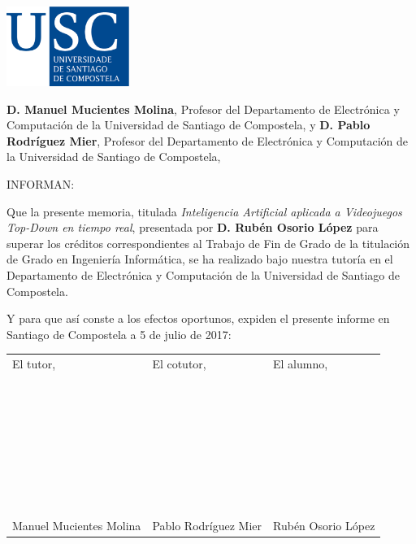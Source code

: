 \pagestyle{plain}
\includegraphics[width=4cm]{figuras/logo_usc.eps}

\vspace{1cm}
{\bf D. Manuel Mucientes Molina}, Profesor del Departamento de Electrónica y Computación de la Universidad de Santiago de Compostela, y {\bf D. Pablo Rodríguez Mier}, Profesor del Departamento de Electrónica y Computación de la Universidad de Santiago de Compostela,

\vspace{1cm}
INFORMAN:

\vspace{1cm}
Que la presente memoria, titulada {\it Inteligencia Artificial aplicada a Videojuegos Top-Down en tiempo real}, presentada por {\bf D. Rubén Osorio López} para superar los créditos correspondientes al Trabajo de Fin de Grado de la titulación de Grado en Ingeniería Informática, se ha realizado bajo nuestra tutoría en el Departamento de Electrónica y Computación de la Universidad de Santiago de Compostela.

\vspace{1cm}
Y para que así conste a los efectos oportunos, expiden el presente informe en Santiago de Compostela a 5 de julio de 2017:

\vspace{2cm}
\begin{tabular}{lll}
El tutor, & El cotutor, & El alumno, \\
~ \\
~ \\
~ \\
~ \\
~ \\
~ \\
~ \\
Manuel Mucientes Molina & Pablo Rodríguez Mier & Rubén Osorio López
\end{tabular}

